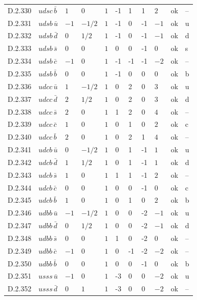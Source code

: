 {\begin{longtable}{@{}llllllllll>{\raggedright\arraybackslash}p{2.0cm}@{}}
D.2.330 & $udsc\,\bar{b}$ & $1$ & $0$ & $1$ & -1 & 1 & 1 & $2$ & ok & -- \\
D.2.331 & $udsb\,\bar{u}$ & $-1$ & $-1/2$ & $1$ & -1 & 0 & -1 & $-1$ & ok & u \\
D.2.332 & $udsb\,\bar{d}$ & $0$ & $1/2$ & $1$ & -1 & 0 & -1 & $-1$ & ok & d \\
D.2.333 & $udsb\,\bar{s}$ & $0$ & $0$ & $1$ & 0 & 0 & -1 & $0$ & ok & s \\
D.2.334 & $udsb\,\bar{c}$ & $-1$ & $0$ & $1$ & -1 & -1 & -1 & $-2$ & ok & -- \\
D.2.335 & $udsb\,\bar{b}$ & $0$ & $0$ & $1$ & -1 & 0 & 0 & $0$ & ok & b \\
D.2.336 & $udcc\,\bar{u}$ & $1$ & $-1/2$ & $1$ & 0 & 2 & 0 & $3$ & ok & u \\
D.2.337 & $udcc\,\bar{d}$ & $2$ & $1/2$ & $1$ & 0 & 2 & 0 & $3$ & ok & d \\
D.2.338 & $udcc\,\bar{s}$ & $2$ & $0$ & $1$ & 1 & 2 & 0 & $4$ & ok & -- \\
D.2.339 & $udcc\,\bar{c}$ & $1$ & $0$ & $1$ & 0 & 1 & 0 & $2$ & ok & c \\
D.2.340 & $udcc\,\bar{b}$ & $2$ & $0$ & $1$ & 0 & 2 & 1 & $4$ & ok & -- \\
D.2.341 & $udcb\,\bar{u}$ & $0$ & $-1/2$ & $1$ & 0 & 1 & -1 & $1$ & ok & u \\
D.2.342 & $udcb\,\bar{d}$ & $1$ & $1/2$ & $1$ & 0 & 1 & -1 & $1$ & ok & d \\
D.2.343 & $udcb\,\bar{s}$ & $1$ & $0$ & $1$ & 1 & 1 & -1 & $2$ & ok & -- \\
D.2.344 & $udcb\,\bar{c}$ & $0$ & $0$ & $1$ & 0 & 0 & -1 & $0$ & ok & c \\
D.2.345 & $udcb\,\bar{b}$ & $1$ & $0$ & $1$ & 0 & 1 & 0 & $2$ & ok & b \\
D.2.346 & $udbb\,\bar{u}$ & $-1$ & $-1/2$ & $1$ & 0 & 0 & -2 & $-1$ & ok & u \\
D.2.347 & $udbb\,\bar{d}$ & $0$ & $1/2$ & $1$ & 0 & 0 & -2 & $-1$ & ok & d \\
D.2.348 & $udbb\,\bar{s}$ & $0$ & $0$ & $1$ & 1 & 0 & -2 & $0$ & ok & -- \\
D.2.349 & $udbb\,\bar{c}$ & $-1$ & $0$ & $1$ & 0 & -1 & -2 & $-2$ & ok & -- \\
D.2.350 & $udbb\,\bar{b}$ & $0$ & $0$ & $1$ & 0 & 0 & -1 & $0$ & ok & b \\
D.2.351 & $usss\,\bar{u}$ & $-1$ & $0$ & $1$ & -3 & 0 & 0 & $-2$ & ok & u \\
D.2.352 & $usss\,\bar{d}$ & $0$ & $1$ & $1$ & -3 & 0 & 0 & $-2$ & ok & -- \\

\end{longtable}}

